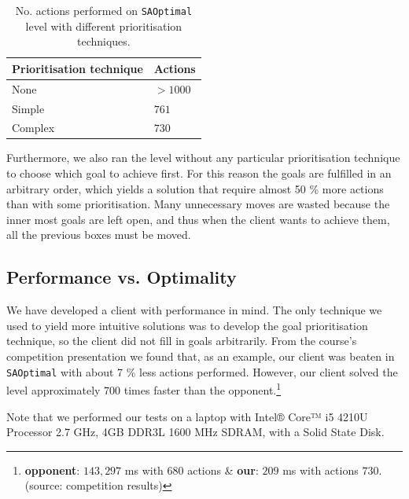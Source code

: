 \begin{table}[h!]
  \centering
  \begin{tabular}{@{}ll@{}}
    \toprule
    Prioritisation technique & Actions \\
    \midrule
    None    & $>1000$ \\
    Simple  & $761$ \\
    Complex & $730$ \\
    \bottomrule
  \end{tabular}
  \caption{\label{tab:SAOptimal_results}No. actions performed on \texttt{SAOptimal} level with different prioritisation techniques.}
\end{table}

Furthermore, we also ran the level without any particular prioritisation technique to choose which goal to achieve first.
For this reason the goals are fulfilled in an arbitrary order, which yields a solution that require almost 50 \% more actions than with some prioritisation.
Many unnecessary moves are wasted because the inner most goals are left open, and thus when the client wants to achieve them, all the previous boxes must be moved.

\subsection{Performance vs. Optimality}
\label{sec:performance vs. optimality}

We have developed a client with performance in mind.
The only technique we used to yield more intuitive solutions was to develop the goal prioritisation technique, so the client did not fill in goals arbitrarily.
From the course's competition presentation we found that, as an example, our client was beaten in \texttt{SAOptimal} with about 7 \% less actions performed.
However, our client solved the level approximately 700 times faster than the opponent.\footnote{\textbf{opponent}: $143,297$ ms with $680$ actions \& \textbf{our}: $209$ ms with actions $730$. (source: competition results)}

Note that we performed our tests on a laptop with Intel® Core™ i5 4210U Processor 2.7 GHz, 4GB DDR3L 1600 MHz SDRAM, with a Solid State Disk.


